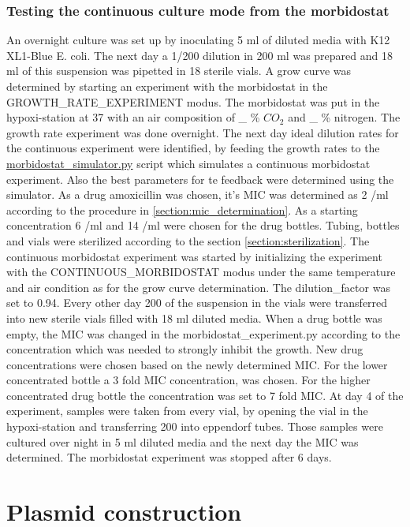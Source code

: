 \subsubsection{Testing the continuous culture mode from the morbidostat}
An overnight culture was set up by inoculating 5 ml of diluted media with K12 XL1-Blue E. coli. The next day a 1/200 dilution in 200 ml was prepared and 18 ml of this suspension was pipetted in 18 sterile vials. A grow curve was determined by starting an experiment with the morbidostat in the GROWTH\_RATE\_EXPERIMENT modus. The morbidostat was put in the hypoxi-station at 37 \degree \space with an air composition of \_ \% $CO_2$ and \_ \% nitrogen. The growth rate experiment was done overnight. The next day ideal dilution rates for the continuous experiment were identified, by feeding the growth rates to the \href{https://github.com/nahanoo/ESBL\_project/}{morbidostat\_simulator.py} script which simulates a continuous morbidostat experiment. Also the best parameters for te feedback were determined using the simulator.
As a drug amoxicillin was chosen, it's MIC was determined as 2 \textmu/ml according to the procedure in \ref{section:mic_determination}. As a starting concentration 6 \textmu/ml and 14 \textmu/ml 
were chosen for the drug bottles. Tubing, bottles and vials were sterilized according to the section \ref{section:sterilization}. The continuous morbidostat experiment was started by initializing the experiment with the 	CONTINUOUS\_MORBIDOSTAT modus under the same temperature and air condition as for the grow curve determination. The dilution\_factor was set to 0.94. Every other day 200 \textmu of the suspension in the vials were transferred into new sterile vials filled with 18 ml diluted media. When a drug bottle was empty, the MIC was changed in the morbidostat\_experiment.py according to the concentration which was needed to strongly inhibit the growth. New drug concentrations were chosen based on the newly determined MIC. For the lower concentrated bottle a 3 fold MIC concentration, was chosen. For the higher concentrated drug bottle the concentration was set to 7 fold MIC. At day 4 of the experiment, samples were taken from every vial, by opening the vial in the hypoxi-station and transferring 200 \textmu into eppendorf tubes. Those samples were cultured over night in 5 ml diluted media and the next day the MIC was determined. The morbidostat experiment was stopped after 6 days.

\section{Plasmid construction}

 